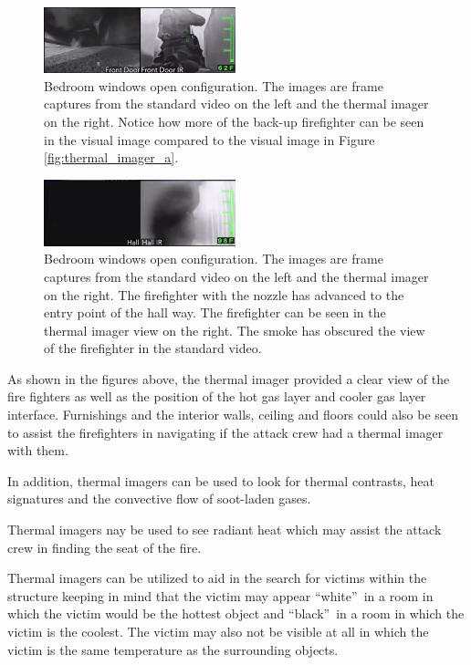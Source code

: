 \documentclass[12pt,oneside]{book}
\begin{document}
\begin{figure}[H]
\centering
\includegraphics[width=0.495\textwidth]{../0_Images/Tactical_Considerations/Thermal_Imager/Exp14FDpair.png}
\caption[Thermal Imager E]{Bedroom windows open configuration.  The images are frame captures from the standard video on the left and the thermal imager on the right.  Notice how more of the back-up firefighter can be seen in the visual image compared to the visual image in Figure \ref{fig:thermal_imager_a}.}
\label{fig:thermal_imager_e}
\end{figure}

\begin{figure}[H]
\centering
\includegraphics[width=0.495\textwidth]{../0_Images/Tactical_Considerations/Thermal_Imager/Exp14Hallpair.png}
\caption[Thermal Imager F]{Bedroom windows open configuration. The images are frame captures from the standard video on the left and the thermal imager on the right. The firefighter with the nozzle has advanced to the entry point of the hall way. The firefighter can be seen in the thermal imager view on the right. The smoke has obscured the view of the firefighter in the standard video.}
\label{fig:thermal_imager_f}
\end{figure}

As shown in the figures above, the thermal imager provided a clear view of the fire fighters as well as the position of the hot gas layer and cooler gas layer interface. Furnishings and the interior walls, ceiling and floors could also be seen to assist the firefighters in navigating if the attack crew had a thermal imager with them.  

In addition, thermal imagers can be used to look for thermal contrasts, heat signatures and the convective flow of soot-laden gases.  

Thermal imagers nay be used to see radiant heat which may assist the attack crew in finding the seat of the fire.

Thermal imagers can be utilized to aid in the search for victims within the structure keeping in mind that the victim may appear \textquotedblleft white\textquotedblright \ in a room in which the victim would be the hottest object and \textquotedblleft black\textquotedblright \ in a room in which the victim is the coolest. The victim may also not be visible at all in which the victim is the same temperature as the surrounding objects.
\end{document}
